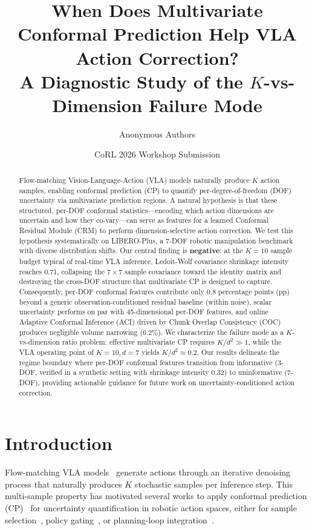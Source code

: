 \documentclass[letterpaper]{article}
\title{When Does Multivariate Conformal Prediction Help VLA Action Correction?\\
\large A Diagnostic Study of the $K$-vs-Dimension Failure Mode}
\author{
Anonymous Authors
}
\date{CoRL 2026 Workshop Submission}
\begin{document}
\maketitle

\begin{abstract}
Flow-matching Vision-Language-Action (VLA) models naturally produce $K$ action samples, enabling conformal prediction (CP) to quantify per-degree-of-freedom (DOF) uncertainty via multivariate prediction regions.
A natural hypothesis is that these structured, per-DOF conformal statistics---encoding which action dimensions are uncertain and how they co-vary---can serve as features for a learned Conformal Residual Module (CRM) to perform dimension-selective action correction.
We test this hypothesis systematically on LIBERO-Plus, a 7-DOF robotic manipulation benchmark with diverse distribution shifts.
Our central finding is \textbf{negative}: at the $K{=}10$ sample budget typical of real-time VLA inference, Ledoit-Wolf covariance shrinkage intensity reaches 0.71, collapsing the $7{\times}7$ sample covariance toward the identity matrix and destroying the cross-DOF structure that multivariate CP is designed to capture.
Consequently, per-DOF conformal features contribute only 0.8 percentage points (pp) beyond a generic observation-conditioned residual baseline (within noise), scalar uncertainty performs on par with 45-dimensional per-DOF features, and online Adaptive Conformal Inference (ACI) driven by Chunk Overlap Consistency (COC) produces negligible volume narrowing ($6.2\%$).
We characterize the failure mode as a $K$-vs-dimension ratio problem: effective multivariate CP requires $K/d^2 \gg 1$, while the VLA operating point of $K{=}10, d{=}7$ yields $K/d^2 \approx 0.2$.
Our results delineate the regime boundary where per-DOF conformal features transition from informative (3-DOF, verified in a synthetic setting with shrinkage intensity 0.32) to uninformative (7-DOF), providing actionable guidance for future work on uncertainty-conditioned action correction.
\end{abstract}

\section{Introduction}

Flow-matching VLA models~\citep{black2024pi0,pertsch2025fast,wen2025tinyvla} generate actions through an iterative denoising process that naturally produces $K$ stochastic samples per inference step.
This multi-sample property has motivated several works to apply conformal prediction (CP)~\citep{vovk2005algorithmic,angelopoulos2021gentle} for uncertainty quantification in robotic action spaces, either for sample selection~\citep{luo2024reconvla}, policy gating~\citep{dixit2024ups}, or planning-loop integration~\citep{lindemann2023safe}.
\end{document}
